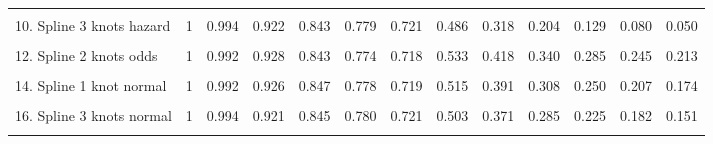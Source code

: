 \documentclass[
]{article}
\begin{document}
\begin{table}
{\begin{tabular}[t]{lrrrrrrrrrrrr}
\cellcolor{gray!6}{9. Spline 2 knots hazard} & \cellcolor{gray!6}{1} & \cellcolor{gray!6}{0.992} & \cellcolor{gray!6}{0.928} & \cellcolor{gray!6}{0.843} & \cellcolor{gray!6}{0.774} & \cellcolor{gray!6}{0.719} & \cellcolor{gray!6}{0.523} & \cellcolor{gray!6}{0.384} & \cellcolor{gray!6}{0.284} & \cellcolor{gray!6}{0.210} & \cellcolor{gray!6}{0.156} & \cellcolor{gray!6}{0.116}\\
10. Spline 3 knots hazard & 1 & 0.994 & 0.922 & 0.843 & 0.779 & 0.721 & 0.486 & 0.318 & 0.204 & 0.129 & 0.080 & 0.050\\
\cellcolor{gray!6}{11. Spline 1 knot odds} & \cellcolor{gray!6}{1} & \cellcolor{gray!6}{0.992} & \cellcolor{gray!6}{0.927} & \cellcolor{gray!6}{0.843} & \cellcolor{gray!6}{0.774} & \cellcolor{gray!6}{0.718} & \cellcolor{gray!6}{0.532} & \cellcolor{gray!6}{0.415} & \cellcolor{gray!6}{0.338} & \cellcolor{gray!6}{0.283} & \cellcolor{gray!6}{0.242} & \cellcolor{gray!6}{0.211}\\
12. Spline 2 knots odds & 1 & 0.992 & 0.928 & 0.843 & 0.774 & 0.718 & 0.533 & 0.418 & 0.340 & 0.285 & 0.245 & 0.213\\
\cellcolor{gray!6}{13. Spline 3 knots odds} & \cellcolor{gray!6}{1} & \cellcolor{gray!6}{0.994} & \cellcolor{gray!6}{0.922} & \cellcolor{gray!6}{0.844} & \cellcolor{gray!6}{0.780} & \cellcolor{gray!6}{0.721} & \cellcolor{gray!6}{0.499} & \cellcolor{gray!6}{0.363} & \cellcolor{gray!6}{0.278} & \cellcolor{gray!6}{0.221} & \cellcolor{gray!6}{0.181} & \cellcolor{gray!6}{0.151}\\
14. Spline 1 knot normal & 1 & 0.992 & 0.926 & 0.847 & 0.778 & 0.719 & 0.515 & 0.391 & 0.308 & 0.250 & 0.207 & 0.174\\
\cellcolor{gray!6}{15. Spline 2 knots normal} & \cellcolor{gray!6}{1} & \cellcolor{gray!6}{0.992} & \cellcolor{gray!6}{0.929} & \cellcolor{gray!6}{0.843} & \cellcolor{gray!6}{0.773} & \cellcolor{gray!6}{0.718} & \cellcolor{gray!6}{0.537} & \cellcolor{gray!6}{0.425} & \cellcolor{gray!6}{0.349} & \cellcolor{gray!6}{0.293} & \cellcolor{gray!6}{0.251} & \cellcolor{gray!6}{0.219}\\
16. Spline 3 knots normal & 1 & 0.994 & 0.921 & 0.845 & 0.780 & 0.721 & 0.503 & 0.371 & 0.285 & 0.225 & 0.182 & 0.151\\
\cellcolor{gray!6}{17. Mixture cure Weibull} & \cellcolor{gray!6}{1} & \cellcolor{gray!6}{0.986} & \cellcolor{gray!6}{0.934} & \cellcolor{gray!6}{0.853} & \cellcolor{gray!6}{0.770} & \cellcolor{gray!6}{0.708} & \cellcolor{gray!6}{0.652} & \cellcolor{gray!6}{0.652} & \cellcolor{gray!6}{0.652} & \cellcolor{gray!6}{0.652} & \cellcolor{gray!6}{0.652} & \cellcolor{gray!6}{0.652}\\

\end{tabular}}
\end{table}
\end{document}
